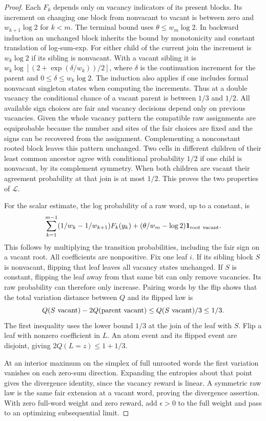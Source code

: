 \documentclass[11pt]{article}
\numberwithin{equation}{section}
\newcommand{\one}{\mathbf 1}
\begin{document}
\begin{proof}
Each $F_k$ depends only on vacancy indicators of its present
blocks. Its increment on changing one block from nonvacant to
vacant is between zero and $w_{k+1}\log2$ for $k<m$.
The terminal bound uses $\theta\le w_m\log2$. In backward
induction an unchanged block inherits the bound by monotonicity
and constant translation of log-sum-exp. For either child of the
current join the increment is $w_k\log2$ if its sibling is
nonvacant. With a vacant sibling it is
$w_k\log[(2+\exp(\delta/w_k))/2]$, where $\delta$ is the
continuation increment for the parent and
$0\le\delta\le w_k\log2$. The induction also applies if one includes formal
nonvacant singleton states when computing the increments. Thus at a double vacancy the conditional chance of a
vacant parent is between $1/3$ and $1/2$. All available sign
choices are fair and vacancy decisions depend only on previous
vacancies. Given the whole vacancy pattern the compatible raw
assignments are equiprobable because the number and sites of the
fair choices are fixed and the signs can be recovered from the
assignment. Complementing a nonconstant rooted block leaves
this pattern unchanged. Two cells in different children of
their least common ancestor agree with conditional probability
$1/2$ if one child is nonvacant, by its complement symmetry.
When both children are vacant their agreement probability at that
join is at most $1/2$. This proves the two properties of $\mathcal L$.

For the scalar estimate, the log probability of a raw word,
up to a constant, is
\[
   \sum_{k=1}^{m-1}(1/w_k-1/w_{k+1})F_k(y_k)
       +(\theta/w_m-\log2)\one_{\rm root\ vacant}.
\]
This follows by multiplying the transition probabilities, including
the fair sign on a vacant root. All coefficients are nonpositive.
Fix one leaf $i$. If its sibling block $S$ is nonvacant, flipping
that leaf leaves all vacancy states unchanged. If $S$ is constant,
flipping the leaf away from that same bit can only remove vacancies.
Its raw probability can therefore only increase. Pairing words by
the flip shows that the total variation distance between $Q$ and
its flipped law is
\[
 Q(S\ {\rm vacant})-2Q({\rm parent\ vacant})
                \le Q(S\ {\rm vacant})/3\le1/3 .
\]
The first inequality uses the lower bound $1/3$ at the join of
the leaf with $S$. Flip a leaf with nonzero coefficient in $L$.
An atom event and its flipped event are disjoint, giving
$2Q(L=z)\le 1+1/3$.

At an interior maximum on the simplex of full unrooted words the
first variation vanishes on each zero-sum direction. Expanding the
entropies about that point gives the divergence identity, since
the vacancy reward is linear. A symmetric raw law is the same
fair extension at a vacant word, proving the divergence assertion.
With zero full-word weight and zero reward, add $\epsilon>0$ to
the full weight and pass to an optimizing subsequential limit.
\end{proof}
\end{document}
